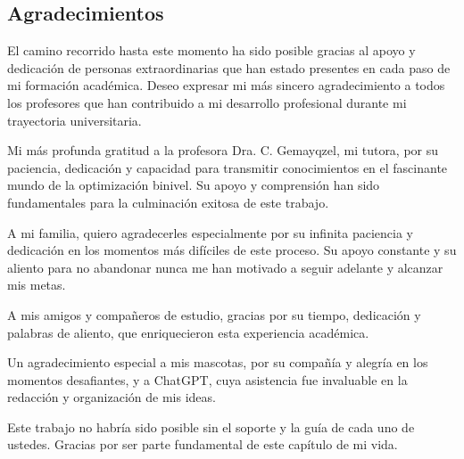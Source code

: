 \begin{acknowledgements}

    \chapter*{Agradecimientos}

    El camino recorrido hasta este momento ha sido posible gracias al apoyo y dedicación de personas extraordinarias que han estado presentes en cada paso de mi formación académica. Deseo expresar mi más sincero agradecimiento a todos los profesores que han contribuido a mi desarrollo profesional durante mi trayectoria universitaria.
    
    Mi más profunda gratitud a la profesora Dra. C. Gemayqzel, mi tutora, por su paciencia, dedicación y capacidad para transmitir conocimientos en el fascinante mundo de la optimización binivel. Su apoyo y comprensión han sido fundamentales para la culminación exitosa de este trabajo.
    
    A mi familia, quiero agradecerles especialmente por su infinita paciencia y dedicación en los momentos más difíciles de este proceso. Su apoyo constante y su aliento para no abandonar nunca me han motivado a seguir adelante y alcanzar mis metas.
    
    A mis amigos y compañeros de estudio, gracias por su tiempo, dedicación y palabras de aliento, que enriquecieron esta experiencia académica. 
    
    Un agradecimiento especial a mis mascotas, por su compañía y alegría en los momentos desafiantes, y a ChatGPT, cuya asistencia fue invaluable en la redacción y organización de mis ideas.
    
    Este trabajo no habría sido posible sin el soporte y la guía de cada uno de ustedes. Gracias por ser parte fundamental de este capítulo de mi vida.
    
    
    
    
\end{acknowledgements}